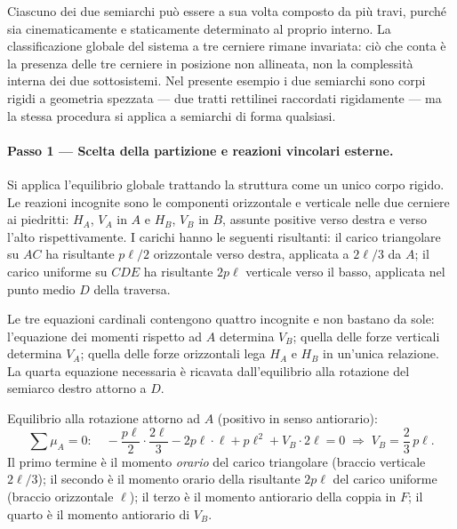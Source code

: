\begin{oss}
	Ciascuno dei due semiarchi può essere a sua volta
	composto da più travi, purché sia cinematicamente
	e staticamente determinato al proprio interno.
	La classificazione globale del sistema a tre cerniere
	rimane invariata: ciò che conta è la presenza delle
	tre cerniere in posizione non allineata, non la
	complessità interna dei due sottosistemi.
	Nel presente esempio i due semiarchi sono corpi
	rigidi a geometria spezzata --- due tratti rettilinei
	raccordati rigidamente --- ma la stessa procedura
	si applica a semiarchi di forma qualsiasi.
\end{oss}


\paragraph{Passo 1 --- Scelta della partizione e	reazioni vincolari esterne.}

Si applica l'equilibrio globale trattando la struttura
come un unico corpo rigido.
Le reazioni incognite sono le componenti orizzontale e
verticale nelle due cerniere ai piedritti:
$H_A$, $V_A$ in $A$ e $H_B$, $V_B$ in $B$,
assunte positive verso destra e verso l'alto rispettivamente.
I carichi hanno le seguenti risultanti:
il carico triangolare su $AC$ ha risultante
$p\ell/2$ orizzontale verso destra,
applicata a $2\ell/3$ da $A$;
il carico uniforme su $CDE$ ha risultante $2p\ell$
verticale verso il basso,
applicata nel punto medio $D$ della traversa.

Le tre equazioni cardinali contengono quattro incognite
e non bastano da sole: l'equazione dei momenti rispetto
ad $A$ determina $V_B$; quella delle forze verticali
determina $V_A$; quella delle forze orizzontali lega
$H_A$ e $H_B$ in un'unica relazione. La quarta equazione
necessaria è ricavata dall'equilibrio alla rotazione
del semiarco destro attorno a $D$.

\medskip
\noindent Equilibrio alla rotazione attorno ad $A$
(positivo in senso antiorario):
\[
\sum \mu_A = 0:\quad
-\frac{p\ell}{2}\cdot\frac{2\ell}{3}
- 2p\ell\cdot\ell
+ p\ell^2
+ V_B\cdot 2\ell
= 0
\;\Rightarrow\;
V_B = \frac{2}{3}\,p\ell.
\]
Il primo termine è il momento \emph{orario} del
carico triangolare (braccio verticale $2\ell/3$);
il secondo è il momento orario della risultante
$2p\ell$ del carico uniforme (braccio orizzontale
$\ell$); il terzo è il momento antiorario della
coppia in $F$; il quarto è il momento antiorario
di $V_B$.

